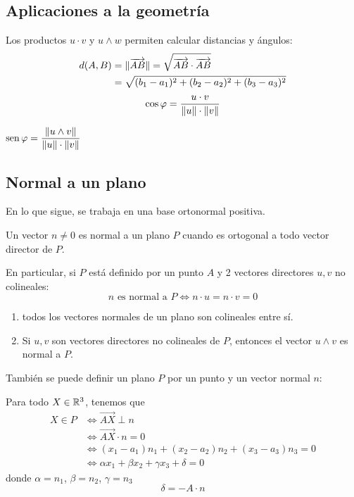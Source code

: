 \documentclass[11pt,a4paper]{article}
\begin{document}

\subsection{Aplicaciones a la geometría}

Los productos $u\cdot v$ y $u\wedge w$ permiten calcular distancias y ángulos:
\begin{align*}
d(A,B)&=\lVert\overrightarrow{AB}\rVert=\sqrt{\overrightarrow{AB}\cdot\overrightarrow{AB}}\\
&=\sqrt{(b_1-a_1)^2+(b_2-a_2)^2+(b_3-a_3)^2}
\end{align*}
\[
\cos\varphi=\frac{u\cdot v}{\lVert u\rVert\cdot\lVert v\rVert}
\]
\begin{center}
$\displaystyle\operatorname{sen}\varphi=\frac{\lVert u\wedge v\rVert}{\lVert u\rVert\cdot\lVert v\rVert}$
\end{center}

\subsection{Normal a un plano}

En lo que sigue, se trabaja en una base ortonormal positiva.

\begin{definicion}
Un vector $n\neq0$ es normal a un plano $P$ cuando es ortogonal a todo vector director de $P$.
\end{definicion}

En particular, si $P$ está definido por un punto $A$ y 2 vectores directores $u,v$ no colineales:
\[
n\text{ es normal a } P\iff n\cdot u=n\cdot v=0
\]

\begin{observacion}\leavevmode
\begin{enumerate}[label=(\arabic*)]
  \item todos los vectores normales de un plano son colineales entre sí.
  \item Si $u,v$ son vectores directores no colineales de $P$, entonces el vector $u\wedge v$ es normal a $P$.
\end{enumerate}
\end{observacion}

También se puede definir un plano $P$ por un punto y un vector normal $n$:

Para todo $X\in\mathbb{R}^3$, tenemos que
\begin{align*}
X\in P&\iff\overrightarrow{AX}\perp n\\
&\iff\overrightarrow{AX}\cdot n=0\\
&\iff(x_1-a_1)n_1+(x_2-a_2)n_2+(x_3-a_3)n_3=0\\
&\iff\alpha x_1+\beta x_2+\gamma x_3+\delta=0
\end{align*}
donde $\alpha=n_1$, $\beta=n_2$, $\gamma=n_3$
\[
\delta=-A\cdot n
\]
\end{document}
